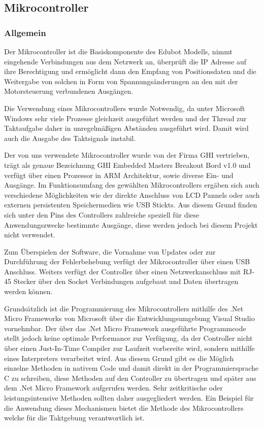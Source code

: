 \subsection{Mikrocontroller}
\subsubsection{Allgemein}

Der Mikrocontroller ist die Basiskomponente des Edubot Modells, nimmt eingehende Verbindungen aus dem Netzwerk an, überprüft die IP Adresse auf ihre Berechtigung und ermöglicht dann den Empfang von Positionsdaten und die Weitergabe von solchen in Form von Spannungsänderungen an den mit der Motorsteuerung verbundenen Ausgängen.

Die Verwendung eines Mikrocontrollers wurde Notwendig, da unter Microsoft Windows sehr viele Prozesse gleichzeit ausgeführt werden und der Thread zur Taktaufgabe daher in unregelmäßigen Abständen ausgeführt wird. Damit wird auch die Ausgabe des Taktsignals instabil.

Der von uns verwendete Mikrocontroller wurde von der Firma GHI vertrieben, trägt als genaue Bezeichnung GHI Embedded Masters Breakout Bord v1.0 und verfügt über einen Prozessor in ARM Architektur, sowie diverse Ein- und Ausgänge. Im Funktionsumfang des gewählten Mikrocontrollers ergäben sich auch verschiedene Möglichkeiten wie der direkte Anschluss von LCD Pannels oder auch externen persistenten Speichermedien wie USB Stickts. Aus diesem Grund finden sich unter den Pins des Controllers zahlreiche speziell für diese Anwendungszwecke bestimmte Ausgänge, diese werden jedoch bei diesem Projekt nicht verwendet.

Zum Überspielen der Software, die Vornahme von Updates oder zur Durchführung der Fehlerbehebung verfügt der Mikrocontroller über einen USB Anschluss. Weiters verfügt der Controller über einen Netzwerkanschluss mit RJ-45 Stecker über den Socket Verbindungen aufgebaut und Daten übertragen werden können.

Grundsätzlich ist die Programmierung des Mikrocontrollers mithilfe des .Net Micro Frameworks von Microsoft über die Entwicklungsumgebung Visual Studio vornehmbar. Der über das .Net Micro Framework ausgeführte Programmcode stellt jedoch keine optimale Performance zur Verfügung, da der Controller nicht über einen Just-In-Time Compiler zur Laufzeit vorbereite wird, sondern mithilfe eines Interpreters verarbeitet wird. Aus diesem Grund gibt es die Möglich einzelne Methoden in nativem Code und damit direkt in der Programmiersprache C zu schreiben, diese Methoden auf den Controller zu übertragen und später aus dem .Net Micro Framework aufgerufen werden. Sehr zeitkritische oder leistungsintensive Methoden sollten daher ausgegliedert werden. Ein Beispiel für die Anwendung dieses Mechanismen bietet die Methode des Mikrocontrollers welche für die Taktgebung verantwortlich ist.

